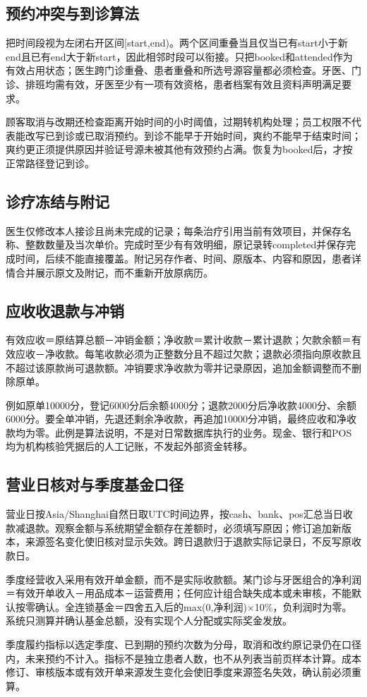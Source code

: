 \documentclass[UTF8,12pt,a4paper,fontset=none]{ctexart}
\begin{document}
\subsection{预约冲突与到诊算法}
把时间段视为左闭右开区间[start,\allowbreak{}end)。两个区间重叠当且仅当已有start小于新end且已有end大于新start，因此相邻时段可以衔接。只把booked和attended作为有效占用状态；医生跨门诊重叠、患者重叠和所选号源容量都必须检查。牙医、门诊、排班均需有效，牙医至少有一项有效资格，患者档案有效且资料声明满足要求。\par
顾客取消与改期还检查距离开始时间的小时阈值，过期转机构处理；员工权限不代表能改写已到诊或已取消预约。到诊不能早于开始时间，爽约不能早于结束时间；爽约更正须提供原因并验证号源未被其他有效预约占满。恢复为booked后，才按正常路径登记到诊。\par
\subsection{诊疗冻结与附记}
医生仅修改本人接诊且尚未完成的记录；每条治疗引用当前有效项目，并保存名称、整数数量及当次单价。完成时至少有有效明细，原记录转completed并保存完成时间，后续不能直接覆盖。附记另存作者、时间、原版本、内容和原因，患者详情合并展示原文及附记，而不重新开放原病历。\par
\subsection{应收收退款与冲销}
有效应收＝原结算总额－冲销金额；净收款＝累计收款－累计退款；欠款余额＝有效应收－净收款。每笔收款必须为正整数分且不超过欠款；退款必须指向原收款且不超过该原款尚可退款额。冲销要求净收款为零并记录原因，追加金额调整而不删除原单。\par
例如原单10000分，登记6000分后余额4000分；退款2000分后净收款4000分、余额6000分。要全单冲销，先退还剩余净收款，再追加10000分冲销，最终应收和净收款均为零。此例是算法说明，不是对日常数据库执行的业务。现金、银行和POS均为机构核验凭据后的人工记账，不发起外部资金转移。\par
\subsection{营业日核对与季度基金口径}
营业日按Asia/\allowbreak{}Shanghai自然日取UTC时间边界，按cash、bank、pos汇总当日收款减退款。观察金额与系统期望金额存在差额时，必须填写原因；修订追加新版本，来源签名变化使旧核对显示失效。跨日退款归于退款实际记录日，不反写原收款日。\par
季度经营收入采用有效开单金额，而不是实际收款额。某门诊与牙医组合的净利润＝有效开单收入－用品成本－运营费用；任何应计组合缺失成本或未审核，不能默认按零确认。全连锁基金＝四舍五入后的max(0,\allowbreak{}净利润)×10\%，负利润时为零。系统只测算并确认基金总额，没有实现个人分配或实际奖金发放。\par
季度履约指标以选定季度、已到期的预约次数为分母，取消和改约原记录仍在口径内，未来预约不计入。指标不是独立患者人数，也不从列表当前页样本计算。成本修订、审核版本或有效开单来源发生变化会使旧季度来源签名失效，确认前必须重算。\par
\end{document}
